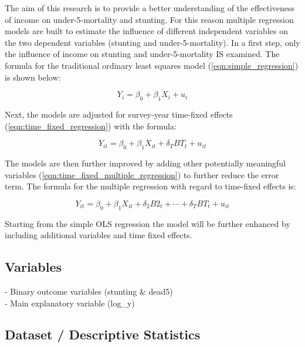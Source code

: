 \documentclass[a4paper, 11pt]{article} %
\begin{document}
The aim of this research is to provide a better understanding of the effectiveness of income on under-5-mortality and stunting. For this reason multiple regression models are built to estimate the influence of different independent variables on the two dependent variables (stunting and under-5-mortality). In a first step, only the influence of income on stunting and under-5-mortality IS examined. The formula for the traditional ordinary least squares model (\ref{eqn:simple_regression}) is shown below:

\begin{equation}
 Y_i = \beta_0 + \beta_1 X_i + u_i
 \label{eqn:simple_regression}
\end{equation}

Next, the models are adjusted for survey-year time-fixed effects (\ref{eqn:time_fixed_regression}) with the formula:

\begin{equation}
Y_{it} = \beta_0 + \beta_1 X_{it} + \delta_T BT_t + u_{it}
 \label{eqn:time_fixed_regression}
\end{equation}

The models are then further improved by adding other potentially meaningful variables (\ref{eqn:time_fixed_multiple_regression}) to further reduce the error term. The formula for the multiple regression with regard to time-fixed effects is:

\begin{equation}
Y_{it} = \beta_0 + \beta_1 X_{it} + \delta_2 B2_t + \cdots + \delta_T BT_t + u_{it}
 \label{eqn:time_fixed_multiple_regression}
\end{equation}

Starting from the simple OLS regression the model will be further enhanced by including additional variables and time fixed effects. 

\subsection*{Variables}
- Binary outcome variables (stunting \& dead5)\\
- Main explanatory variable (log\_y)

\subsection*{Dataset / Descriptive Statistics}
\end{document}
